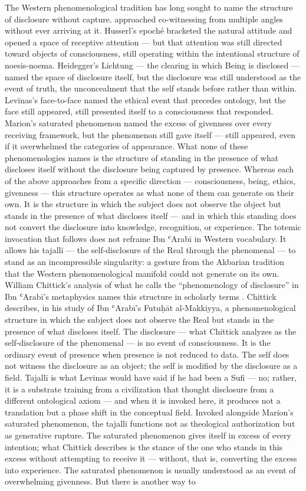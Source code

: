The Western phenomenological tradition has long sought to name the structure of disclosure without capture. approached co-witnessing from multiple angles without ever arriving at it. Husserl’s epoché bracketed the natural attitude and opened a space of receptive attention — but that attention was still directed toward objects of consciousness, still operating within the intentional structure of noesis-noema. Heidegger’s Lichtung — the clearing in which Being is disclosed — named the space of disclosure itself, but the disclosure was still understood as the event of truth, the unconcealment that the self stands before rather than within. Levinas’s face-to-face named the ethical event that precedes ontology, but the face still appeared, still presented itself to a consciousness that responded. Marion’s saturated phenomenon named the excess of givenness over every receiving framework, but the phenomenon still gave itself — still appeared, even if it overwhelmed the categories of appearance. What none of these phenomenologies names is the structure of standing in the presence of what discloses itself without the disclosure being captured by presence. Whereas each of the above approaches from a specific direction — consciousness, being, ethics, givenness — this structure operates as what none of them can generate on their own. It is the structure in which the subject does not observe the object but stands in the presence of what discloses itself — and in which this standing does not convert the disclosure into knowledge, recognition, or experience. The totemic invocation that follows does not reframe Ibn ʿArabī in Western vocabulary. It allows his tajallī — the self-disclosure of the Real through the phenomenal — to stand as an incompressible singularity: a gesture from the Akbarian tradition that the Western phenomenological manifold could not generate on its own. William Chittick’s analysis of what he calls the “phenomenology of disclosure” in Ibn ʿArabī’s metaphysics names this structure in scholarly terms \cite[pp.~121--156]{chittick_1989}. Chittick describes, in his study of Ibn ʿArabī’s Futuḥāt al-Makkiyya, a phenomenological structure in which the subject does not observe the Real but stands in the presence of what discloses itself. The disclosure — what Chittick analyzes as the self-disclosure of the phenomenal — is no event of consciousness. It is the ordinary event of presence when presence is not reduced to data. The self does not witness the disclosure as an object; the self is modified by the disclosure as a field. Tajallī is what Levinas would have said if he had been a Sufi — no; rather, it is a substrate training from a civilization that thought disclosure from a different ontological axiom — and when it is invoked here, it produces not a translation but a phase shift in the conceptual field. Invoked alongside Marion’s saturated phenomenon, the tajallī functions not as theological authorization but as generative rupture. The saturated phenomenon gives itself in excess of every intention; what Chittick describes is the stance of the one who stands in this excess without attempting to receive it — without, that is, converting the excess into experience. The saturated phenomenon is usually understood as an event of overwhelming givenness. But there is another way to 
